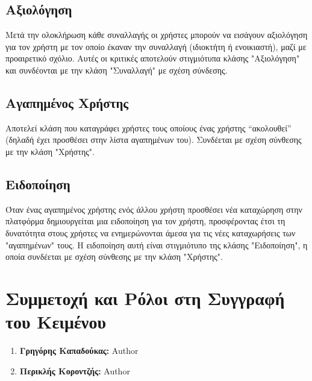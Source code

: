 \documentclass[12pt,a4paper]{article}
\begin{document}
\subsection{Αξιολόγηση}
Μετά την ολοκλήρωση κάθε συναλλαγής οι χρήστες μπορούν να εισάγουν αξιολόγηση για τον χρήστη με τον οποίο έκαναν την συναλλαγή (ιδιοκτήτη ή ενοικιαστή), μαζί με προαιρετικό σχόλιο. Αυτές οι κριτικές αποτελούν στιγμιότυπα κλάσης "Αξιολόγηση" και συνδέονται με την κλάση "Συναλλαγή" με σχέση σύνδεσης.


\subsection{Αγαπημένος Χρήστης}
Αποτελεί κλάση που καταγράφει χρήστες τους οποίους ένας χρήστης “ακολουθεί” (δηλαδή έχει προσθέσει στην λίστα αγαπημένων του). Συνδέεται με σχέση σύνθεσης με την κλάση "Χρήστης".

\subsection{Ειδοποίηση}
Όταν ένας αγαπημένος χρήστης ενός άλλου χρήστη προσθέσει νέα καταχώρηση στην πλατφόρμα δημιουργείται μια ειδοποίηση για τον χρήστη, προσφέροντας έτσι τη δυνατότητα στους χρήστες να ενημερώνονται άμεσα για τις νέες καταχωρήσεις των "αγαπημένων" τους. Η ειδοποίηση αυτή είναι στιγμιότυπο της κλάσης "Ειδοποίηση", η οποία συνδέεται με σχέση σύνθεσης με την κλάση "Χρήστης".

\section{Συμμετοχή και Ρόλοι στη Συγγραφή του Κειμένου}
\begin{enumerate}
	\item \textbf{Γρηγόρης Καπαδούκας:} Author
	\item \textbf{Περικλής Κοροντζής:} Author
\end{enumerate}
\end{document}
